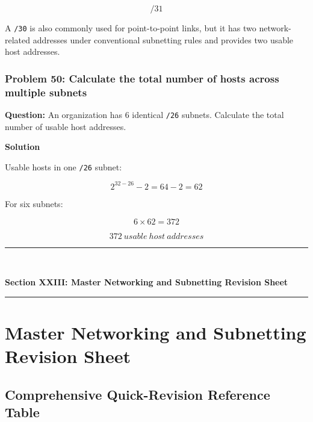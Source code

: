 \[
\boxed{/31}
\]



A \texttt{/30} is also commonly used for point-to-point links, but it has two network-related addresses under conventional subnetting rules and provides two usable host addresses.

\subsubsection*{Problem 50: Calculate the total number of hosts across multiple subnets}

\textbf{Question:} An organization has 6 identical \texttt{/26} subnets. Calculate the total number of usable host addresses.

\textbf{Solution}

Usable hosts in one \texttt{/26} subnet:



\[
2^{32-26}-2=64-2=62
\]



For six subnets:



\[
6\times62=372
\]





\[
\boxed{372\ usable\ host\ addresses}
\]




\newpage
\begin{center}
\vspace{0.5em}
{\color{primary}\rule{0.45\textwidth}{1.2pt}\\[4pt]}
{\Large\bfseries\color{primary} Section XXIII: Master Networking and Subnetting Revision Sheet\\[2pt]}
{\color{primary}\rule{0.45\textwidth}{1.2pt}}
\vspace{0.5em}
\end{center}

\section{Master Networking and Subnetting Revision Sheet}

\subsection{Comprehensive Quick-Revision Reference Table}

